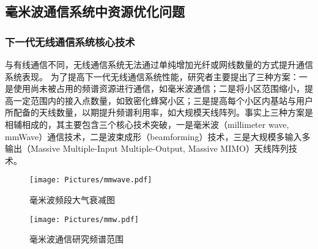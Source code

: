 \subsection{毫米波通信系统中资源优化问题}

\subsubsection{下一代无线通信系统核心技术}

与有线通信不同，无线通信系统无法通过单纯增加光纤或网线数量的方式提升通信系统表现\cite{marzetta2015massive}。
为了提高下一代无线通信系统性能，研究者主要提出了三种方案：一是使用尚未被占用的频谱资源进行通信，如毫米波通信；二是将小区范围缩小，提高一定范围内的接入点数量，如致密化蜂窝小区；三是提高每个小区内基站与用户所配备的天线数量，以期提升频谱利用率，如大规模天线阵列。事实上三种方案是相辅相成的，其主要包含三个核心技术突破，一是毫米波（millimeter wave, mmWave）通信技术，二是波束成形（beamforming）技术，三是大规模多输入多输出（Massive Multiple-Input Multiple-Output, Massive MIMO）天线阵列技术。

\begin{figure}[htbp]
	\centering
	\texttt{[image: Pictures/mmwave.pdf]}
	\caption{毫米波频段大气衰减图\cite{rappaport2011state}}
	\label{fig:mmwave}
\end{figure}

\begin{figure}[htbp]
	\centering
	\texttt{[image: Pictures/mmw.pdf]}
	\caption{毫米波通信研究频谱范围}
	\label{fig:mmw}
\end{figure}

